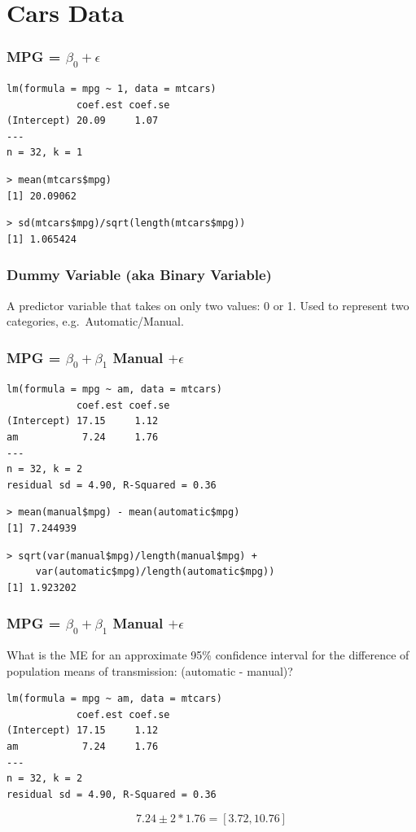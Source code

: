 \documentclass{beamer}
\begin{document}
\section{Cars Data}
\begin{frame}[fragile]
\frametitle{MPG = $\beta_0 +  \epsilon$}
\footnotesize
\begin{verbatim}
lm(formula = mpg ~ 1, data = mtcars)
            coef.est coef.se
(Intercept) 20.09     1.07  
---
n = 32, k = 1
\end{verbatim}
\pause
\begin{verbatim}
> mean(mtcars$mpg)
[1] 20.09062
\end{verbatim}
\pause
\begin{verbatim}
> sd(mtcars$mpg)/sqrt(length(mtcars$mpg))
[1] 1.065424
\end{verbatim}
\end{frame}

\begin{frame}
\frametitle{Dummy Variable (aka Binary Variable)}
 
A predictor variable that takes on only two values: 0 or 1. Used to represent two categories, e.g.\ Automatic/Manual.
\end{frame}



\begin{frame}[fragile]
\frametitle{MPG = $\beta_0 + \beta_1$ Manual $+ \epsilon$}

\footnotesize
\begin{verbatim}
lm(formula = mpg ~ am, data = mtcars)
            coef.est coef.se
(Intercept) 17.15     1.12  
am           7.24     1.76  
---
n = 32, k = 2
residual sd = 4.90, R-Squared = 0.36
\end{verbatim}
\pause
\begin{verbatim}
> mean(manual$mpg) - mean(automatic$mpg)
[1] 7.244939
\end{verbatim}
\pause
\begin{verbatim}
> sqrt(var(manual$mpg)/length(manual$mpg) + 
     var(automatic$mpg)/length(automatic$mpg))
[1] 1.923202
\end{verbatim}
\end{frame}




\begin{frame}[fragile]
\frametitle{MPG = $\beta_0 + \beta_1$ Manual $+ \epsilon$ }

\alert{What is the ME for an approximate 95\% confidence interval for the difference of population means of transmission: (automatic - manual)?}

\footnotesize
\begin{verbatim}
lm(formula = mpg ~ am, data = mtcars)
            coef.est coef.se
(Intercept) 17.15     1.12  
am           7.24     1.76  
---
n = 32, k = 2
residual sd = 4.90, R-Squared = 0.36
\end{verbatim}

\pause
$$
7.24 \pm 2 * 1.76 = [3.72, 10.76]
$$

\end{frame}
\end{document}

